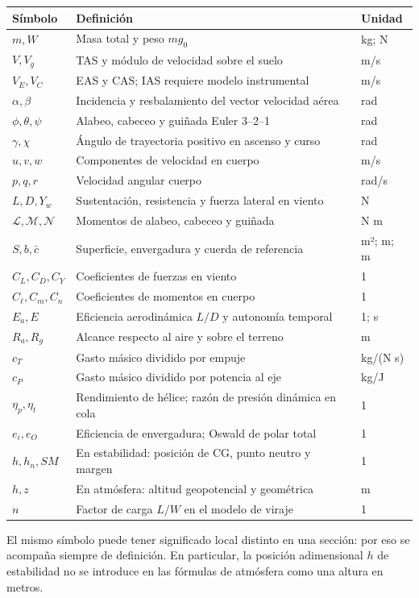 \begin{longtable}{p{.16\linewidth}p{.56\linewidth}p{.20\linewidth}}
\toprule Símbolo&Definición&Unidad\\\midrule\endhead
$m,W$&Masa total y peso $mg_0$&kg; N\\
$V,V_g$&TAS y módulo de velocidad sobre el suelo&m/s\\
$V_E,V_C$&EAS y CAS; IAS requiere modelo instrumental&m/s\\
$\alpha,\beta$&Incidencia y resbalamiento del vector velocidad aérea&rad\\
$\phi,\theta,\psi$&Alabeo, cabeceo y guiñada Euler 3--2--1&rad\\
$\gamma,\chi$&Ángulo de trayectoria positivo en ascenso y curso&rad\\
$u,v,w$&Componentes de velocidad en cuerpo&m/s\\
$p,q,r$&Velocidad angular cuerpo&rad/s\\
$L,D,Y_w$&Sustentación, resistencia y fuerza lateral en viento&N\\
$\mathcal L,\mathcal M,\mathcal N$&Momentos de alabeo, cabeceo y guiñada&N m\\
$S,b,\bar c$&Superficie, envergadura y cuerda de referencia&m²; m; m\\
$C_L,C_D,C_Y$&Coeficientes de fuerzas en viento&1\\
$C_\ell,C_m,C_n$&Coeficientes de momentos en cuerpo&1\\
$E_a,E$&Eficiencia aerodinámica $L/D$ y autonomía temporal&1; s\\
$R_a,R_g$&Alcance respecto al aire y sobre el terreno&m\\
$c_T$&Gasto másico dividido por empuje&kg/(N s)\\
$c_P$&Gasto másico dividido por potencia al eje&kg/J\\
$\eta_p,\eta_t$&Rendimiento de hélice; razón de presión dinámica en cola&1\\
$e_i,e_O$&Eficiencia de envergadura; Oswald de polar total&1\\
$h,h_n,SM$&En estabilidad: posición de CG, punto neutro y margen&1\\
$h,z$&En atmósfera: altitud geopotencial y geométrica&m\\
$n$&Factor de carga $L/W$ en el modelo de viraje&1\\
\bottomrule
\end{longtable}
El mismo símbolo puede tener significado local distinto en una sección: por eso se acompaña siempre de definición. En particular, la posición adimensional $h$ de estabilidad no se introduce en las fórmulas de atmósfera como una altura en metros.


